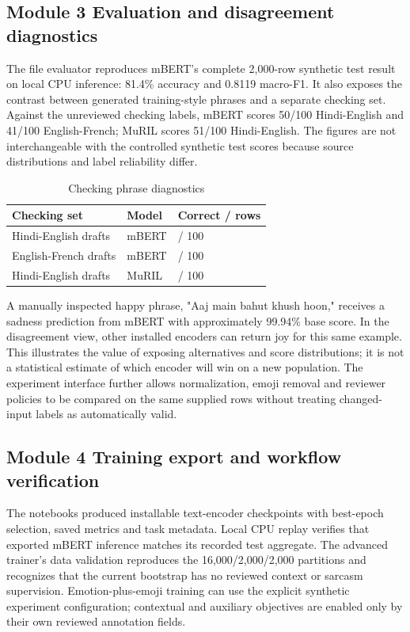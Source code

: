 \documentclass[conference]{IEEEtran}
\begin{document}
\subsection{Module 3 Evaluation and disagreement diagnostics}

The file evaluator reproduces mBERT's complete 2,000-row synthetic test result on local CPU inference: 81.4\% accuracy and 0.8119 macro-F1. It also exposes the contrast between generated training-style phrases and a separate checking set. Against the unreviewed checking labels, mBERT scores 50/100 Hindi-English and 41/100 English-French; MuRIL scores 51/100 Hindi-English. The figures are not interchangeable with the controlled synthetic test scores because source distributions and label reliability differ.

\begin{table}[!t]
\caption{Checking phrase diagnostics}
\centering
\footnotesize
\begin{tabularx}{\columnwidth}{@{}>{\raggedright\arraybackslash}X>{\raggedright\arraybackslash}X>{\raggedleft\arraybackslash}X@{}}
\toprule
\textbf{Checking set} & \textbf{Model} & \textbf{Correct / rows} \\
\midrule
Hindi-English drafts & mBERT & 50 / 100 \\
English-French drafts & mBERT & 41 / 100 \\
Hindi-English drafts & MuRIL & 51 / 100 \\
\bottomrule
\end{tabularx}
\end{table}


A manually inspected happy phrase, "Aaj main bahut khush hoon," receives a sadness prediction from mBERT with approximately 99.94\% base score. In the disagreement view, other installed encoders can return joy for this same example. This illustrates the value of exposing alternatives and score distributions; it is not a statistical estimate of which encoder will win on a new population. The experiment interface further allows normalization, emoji removal and reviewer policies to be compared on the same supplied rows without treating changed-input labels as automatically valid.

\subsection{Module 4 Training export and workflow verification}

The notebooks produced installable text-encoder checkpoints with best-epoch selection, saved metrics and task metadata. Local CPU replay verifies that exported mBERT inference matches its recorded test aggregate. The advanced trainer's data validation reproduces the 16,000/2,000/2,000 partitions and recognizes that the current bootstrap has no reviewed context or sarcasm supervision. Emotion-plus-emoji training can use the explicit synthetic experiment configuration; contextual and auxiliary objectives are enabled only by their own reviewed annotation fields.
\end{document}
